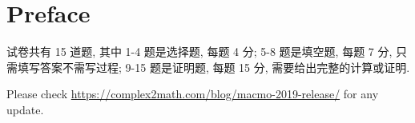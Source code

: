 \documentclass[10pt]{article}
\begin{document}


{}
\section*{Preface}

试卷共有 15 道题, 其中 1-4 题是选择题, 每题 4 分;
5-8 题是填空题, 每题 7 分, 只需填写答案不需写过程;
9-15 题是证明题, 每题 15 分, 需要给出完整的计算或证明.

\bigskip

Please check \url{https://complex2math.com/blog/macmo-2019-release/} for any update.

\newpage






























\end{document}
